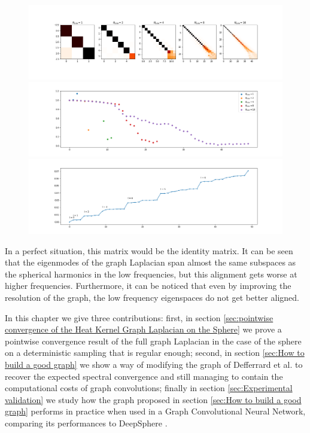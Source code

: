 \begin{figure}	
	\begin{center}
		\includegraphics[width=0.9\linewidth]{../codes/02.HeatKernelGraphLaplacian/HEALPix/06_figures/deepsphere_original.png}
		\includegraphics[width=0.9\linewidth]{../codes/02.HeatKernelGraphLaplacian/HEALPix/06_figures/deepsphere_original_diagonal.png}
		\includegraphics[width=0.9\linewidth]{../codes/02.HeatKernelGraphLaplacian/HEALPix/05_figs/old_results3.png}
	\end{center}
\end{figure} 
In a perfect situation, this matrix would be the identity matrix. It can be seen that the eigenmodes of the graph Laplacian span almost the same subspaces as the spherical harmonics in the low frequencies, but this alignment gets worse at higher frequencies. Furthermore, it can be noticed that even by improving the resolution of the graph, the low frequency eigenspaces do not get better aligned.

In this chapter we give three contributions: first, in section \ref{sec:pointwise convergence of the Heat Kernel Graph Laplacian on the Sphere} we prove a pointwise convergence result of the full graph Laplacian in the case of the sphere on a deterministic sampling that is regular enough; second, in section \ref{sec:How to build a good graph} we show a way of modifying the graph of Defferrard et al. to recover the expected spectral convergence and still managing to contain the computational costs of graph convolutions; finally in section \ref{sec:Experimental validation} we study how the graph proposed in section \ref{sec:How to build a good graph} performs in practice when used in a Graph Convolutional Neural Network, comparing its performances to DeepSphere \cite{DeepSphere}.

